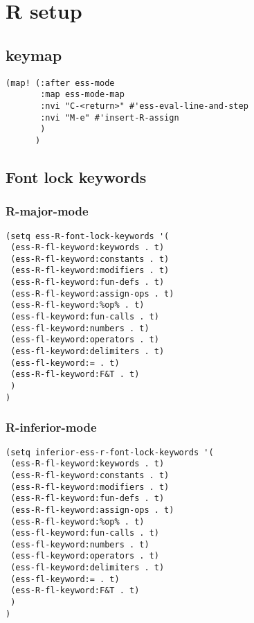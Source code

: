 \documentclass{assignments}
\begin{document}
\section*{R setup}
\label{sec:org758312f}
\subsection*{keymap}
\label{sec:org08ea6db}
\begin{verbatim}
(map! (:after ess-mode
       :map ess-mode-map
       :nvi "C-<return>" #'ess-eval-line-and-step
       :nvi "M-e" #'insert-R-assign
       )
      )
\end{verbatim}
\subsection*{Font lock keywords}
\label{sec:org5fd4a3e}
\subsubsection*{R-major-mode}
\label{sec:org97c190b}
\begin{verbatim}
(setq ess-R-font-lock-keywords '(
 (ess-R-fl-keyword:keywords . t)
 (ess-R-fl-keyword:constants . t)
 (ess-R-fl-keyword:modifiers . t)
 (ess-R-fl-keyword:fun-defs . t)
 (ess-R-fl-keyword:assign-ops . t)
 (ess-R-fl-keyword:%op% . t)
 (ess-fl-keyword:fun-calls . t)
 (ess-fl-keyword:numbers . t)
 (ess-fl-keyword:operators . t)
 (ess-fl-keyword:delimiters . t)
 (ess-fl-keyword:= . t)
 (ess-R-fl-keyword:F&T . t)
 )
)
\end{verbatim}

\subsubsection*{R-inferior-mode}
\label{sec:orge121a90}
\begin{verbatim}
(setq inferior-ess-r-font-lock-keywords '(
 (ess-R-fl-keyword:keywords . t)
 (ess-R-fl-keyword:constants . t)
 (ess-R-fl-keyword:modifiers . t)
 (ess-R-fl-keyword:fun-defs . t)
 (ess-R-fl-keyword:assign-ops . t)
 (ess-R-fl-keyword:%op% . t)
 (ess-fl-keyword:fun-calls . t)
 (ess-fl-keyword:numbers . t)
 (ess-fl-keyword:operators . t)
 (ess-fl-keyword:delimiters . t)
 (ess-fl-keyword:= . t)
 (ess-R-fl-keyword:F&T . t)
 )
)
\end{verbatim}
\end{document}
